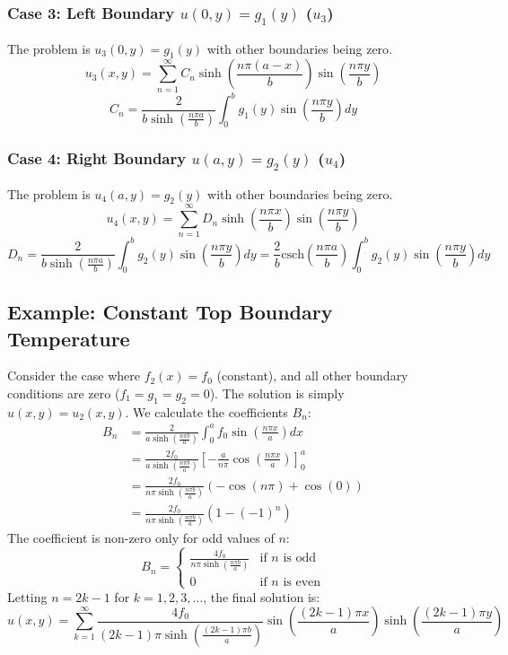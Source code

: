 \documentclass{article}
\begin{document}
	\subsubsection*{Case 3: Left Boundary $u(0,y)=g_1(y)$ ($u_3$)}
	The problem is $u_3(0,y)=g_1(y)$ with other boundaries being zero.
	$$ u_3(x,y) = \sum_{n=1}^{\infty} C_n \sinh\left(\frac{n\pi(a-x)}{b}\right) \sin\left(\frac{n\pi y}{b}\right) $$
	$$ C_n = \frac{2}{b \sinh\left(\frac{n\pi a}{b}\right)} \int_0^b g_1(y) \sin\left(\frac{n\pi y}{b}\right) dy $$
	
	\subsubsection*{Case 4: Right Boundary $u(a,y)=g_2(y)$ ($u_4$)}
	The problem is $u_4(a,y)=g_2(y)$ with other boundaries being zero.
	$$ u_4(x,y) = \sum_{n=1}^{\infty} D_n \sinh\left(\frac{n\pi x}{b}\right) \sin\left(\frac{n\pi y}{b}\right) $$
	$$ D_n = \frac{2}{b \sinh\left(\frac{n\pi a}{b}\right)} \int_0^b g_2(y) \sin\left(\frac{n\pi y}{b}\right) dy = \frac{2}{b} \text{csch}\left(\frac{n\pi a}{b}\right) \int_0^b g_2(y) \sin\left(\frac{n\pi y}{b}\right) dy $$
	
	\subsection*{Example: Constant Top Boundary Temperature}
	Consider the case where $f_2(x) = f_0$ (constant), and all other boundary conditions are zero ($f_1=g_1=g_2=0$). The solution is simply $u(x,y) = u_2(x,y)$. We calculate the coefficients $B_n$:
	\begin{align*}
		B_n &= \frac{2}{a \sinh\left(\frac{n\pi b}{a}\right)} \int_0^a f_0 \sin\left(\frac{n\pi x}{a}\right) dx \\
		&= \frac{2f_0}{a \sinh\left(\frac{n\pi b}{a}\right)} \left[ -\frac{a}{n\pi} \cos\left(\frac{n\pi x}{a}\right) \right]_0^a \\
		&= \frac{2f_0}{n\pi \sinh\left(\frac{n\pi b}{a}\right)} (-\cos(n\pi) + \cos(0)) \\
		&= \frac{2f_0}{n\pi \sinh\left(\frac{n\pi b}{a}\right)} (1 - (-1)^n)
	\end{align*}
	The coefficient is non-zero only for odd values of $n$:
	$$ B_n = \begin{cases} \frac{4f_0}{n\pi \sinh\left(\frac{n\pi b}{a}\right)} & \text{if } n \text{ is odd} \\ 0 & \text{if } n \text{ is even} \end{cases} $$
	Letting $n=2k-1$ for $k=1, 2, 3, \dots$, the final solution is:
	$$ u(x,y) = \sum_{k=1}^{\infty} \frac{4f_0}{(2k-1)\pi \sinh\left(\frac{(2k-1)\pi b}{a}\right)} \sin\left(\frac{(2k-1)\pi x}{a}\right) \sinh\left(\frac{(2k-1)\pi y}{a}\right) $$
\end{document}
